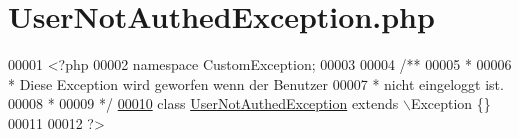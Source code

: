 \hypertarget{_user_not_authed_exception_8php}{\section{User\-Not\-Authed\-Exception.\-php}
\label{_user_not_authed_exception_8php}
}

\begin{DoxyCode}
00001 <?php
00002 \textcolor{keyword}{namespace }CustomException;
00003 \textcolor{comment}{}
00004 \textcolor{comment}{/**}
00005 \textcolor{comment}{ * }
00006 \textcolor{comment}{ * Diese Exception wird geworfen wenn der Benutzer}
00007 \textcolor{comment}{ * nicht eingeloggt ist.}
00008 \textcolor{comment}{ * }
00009 \textcolor{comment}{ */}
\hypertarget{_user_not_authed_exception_8php_source_l00010}{}\hyperlink{class_custom_exception_1_1_user_not_authed_exception}{00010} \textcolor{keyword}{class }\hyperlink{class_custom_exception_1_1_user_not_authed_exception}{UserNotAuthedException} \textcolor{keyword}{extends} \(\backslash\)Exception \{\}
00011 
00012 ?>
\end{DoxyCode}
